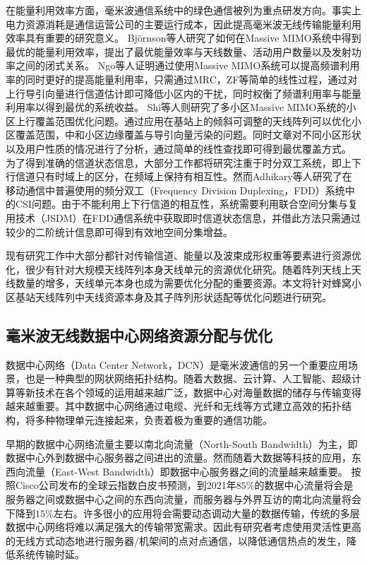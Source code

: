 在能量利用效率方面，毫米波通信系统中的绿色通信被列为重点研发方向。事实上电力资源消耗是通信运营公司的主要运行成本，因此提高毫米波无线传输能量利用效率具有重要的研究意义。
Bj{\"o}rnson等人研究了如何在Massive MIMO系统中得到最优的能量利用效率\cite{bjornson2015optimal}，提出了最优能量效率与天线数量、活动用户数量以及发射功率之间的闭式关系。
Ngo等人证明通过使用Massive MIMO系统可以提高频谱利用率的同时更好的提高能量利用率\cite{ngo2013energy}，只需通过MRC，ZF等简单的线性过程，通过对上行导引向量进行信道估计即可降低小区内的干扰，同时权衡了频谱利用率与能量利用率以得到最优的系统收益。
Shi等人则研究了多小区Massive MIMO系统的小区上行覆盖范围优化问题\cite{jin2015cell}。通过应用在基站上的倾斜可调整的天线阵列可以优化小区覆盖范围，中和小区边缘覆盖与导引向量污染的问题。同时文章对不同小区形状以及用户性质的情况进行了分析，通过简单的线性查找即可得到最优覆盖方式。
为了得到准确的信道状态信息，大部分工作都将研究注重于时分双工系统，即上下行信道只有时域上的区分，在频域上保持有相互性。然而Adhikary等人研究了在移动通信中普遍使用的频分双工（Frequency Division Duplexing，FDD）系统\cite{adhikary2013joint}中的CSI问题。由于不能利用上下行信道的相互性，系统需要利用联合空间分集与复用技术（JSDM）在FDD通信系统中获取即时信道状态信息，并借此方法只需通过较少的二阶统计信息即可得到有效地空间分集增益。

现有研究工作中大部分都针对传输信道、能量以及波束成形权重等要素进行资源优化，很少有针对大规模天线阵列本身天线单元的资源优化研究。随着阵列天线上天线数量的增多，天线单元本身也成为需要优化分配的重要资源。本文将针对蜂窝小区基站天线阵列中天线资源本身及其子阵列形状适配等优化问题进行研究。

\subsection{毫米波无线数据中心网络资源分配与优化}

数据中心网络（Data Center Network，DCN）是毫米波通信的另一个重要应用场景，也是一种典型的网状网络拓扑结构。随着大数据、云计算、人工智能、超级计算等新技术在各个领域的运用越来越广泛，数据中心对海量数据的储存与传输变得越来越重要。其中数据中心网络通过电缆、光纤和无线等方式建立高效的拓扑结构，将多种物理单元连接起来，负责着极为重要的通信功能。

早期的数据中心网络流量主要以南北向流量（North-South Bandwidth）为主，即数据中心外到数据中心服务器之间进出的流量。然而随着大数据等科技的应用，东西向流量（East-West Bandwidth）即数据中心服务器之间的流量越来越重要。 按照Cisco公司发布的全球云指数白皮书\cite{cisco2018cloud}预测，到2021年$85\%$的数据中心流量将会是服务器之间或数据中心之间的东西向流量，而服务器与外界互访的南北向流量将会下降到$15\%$左右。许多很小的应用将会需要动态调动大量的数据传输，传统的多层数据中心网络将难以满足强大的传输带宽需求。因此有研究者考虑使用灵活性更高的无线方式动态地进行服务器/机架间的点对点通信，以降低通信热点的发生，降低系统传输时延。

